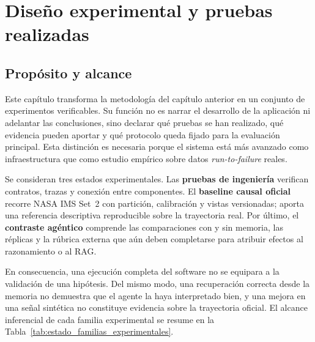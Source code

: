 \chapter{Diseño experimental y pruebas realizadas}\label{chap:experimentos}

\section{Propósito y alcance}

Este capítulo transforma la metodología del capítulo anterior en un conjunto
de experimentos verificables. Su función no es narrar el desarrollo de la
aplicación ni adelantar las conclusiones, sino declarar qué pruebas se han
realizado, qué evidencia pueden aportar y qué protocolo queda fijado para la
evaluación principal. Esta distinción es necesaria porque el sistema está más
avanzado como infraestructura que como estudio empírico sobre datos
\textit{run-to-failure} reales.

Se consideran tres estados experimentales. Las \textbf{pruebas de ingeniería}
verifican contratos, trazas y conexión entre componentes. El \textbf{baseline
causal oficial} recorre NASA IMS Set~2 con partición, calibración y vistas
versionadas; aporta una referencia descriptiva reproducible sobre la trayectoria
real. Por último, el \textbf{contraste agéntico} comprende las comparaciones con
y sin memoria, las réplicas y la rúbrica externa que aún deben completarse para
atribuir efectos al razonamiento o al RAG.

En consecuencia, una ejecución completa del software no se equipara a la
validación de una hipótesis. Del mismo modo, una recuperación correcta desde
la memoria no demuestra que el agente la haya interpretado bien, y una mejora
en una señal sintética no constituye evidencia sobre la trayectoria oficial.
El alcance inferencial de cada familia experimental se resume en la
Tabla~\ref{tab:estado_familias_experimentales}.

